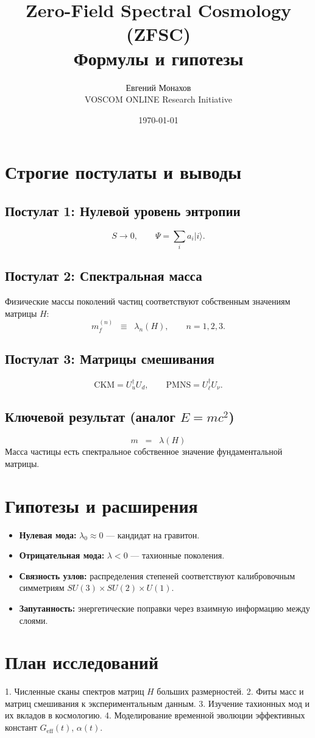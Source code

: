 \documentclass[12pt,a4paper]{article}
\title{Zero-Field Spectral Cosmology (ZFSC) \\ 
Формулы и гипотезы}
\author{Евгений Монахов \\ VOSCOM ONLINE Research Initiative}
\date{\today}
\begin{document}
\maketitle

\section*{Строгие постулаты и выводы}

\subsection*{Постулат 1: Нулевой уровень энтропии}
\[
S \to 0, \qquad 
\Psi = \sum_{i} a_i |i\rangle .
\]

\subsection*{Постулат 2: Спектральная масса}
Физические массы поколений частиц соответствуют собственным значениям матрицы $H$:
\[
m_f^{(n)} \;\;\equiv\;\; \lambda_n(H), \qquad n=1,2,3.
\]

\subsection*{Постулат 3: Матрицы смешивания}
\[
\mathrm{CKM} = U_u^\dagger U_d, 
\qquad
\mathrm{PMNS} = U_\ell^\dagger U_\nu .
\]

\subsection*{Ключевой результат (аналог $E=mc^2$)}
\[
\boxed{ \; m \;\;=\;\; \lambda(H) \;}
\]
Масса частицы есть спектральное собственное значение фундаментальной матрицы.

\bigskip

\section*{Гипотезы и расширения}

\begin{itemize}
  \item \textbf{Нулевая мода:} $\lambda_0 \approx 0$ — кандидат на гравитон.  
  \item \textbf{Отрицательная мода:} $\lambda < 0$ — тахионные поколения.  
  \item \textbf{Связность узлов:} распределения степеней соответствуют калибровочным симметриям $SU(3)\times SU(2)\times U(1)$.  
  \item \textbf{Запутанность:} энергетические поправки через взаимную информацию между слоями.  
\end{itemize}

\section*{План исследований}

1. Численные сканы спектров матриц $H$ больших размерностей.  
2. Фиты масс и матриц смешивания к экспериментальным данным.  
3. Изучение тахионных мод и их вкладов в космологию.  
4. Моделирование временной эволюции эффективных констант $G_\mathrm{eff}(t)$, $\alpha(t)$.  
\end{document}
